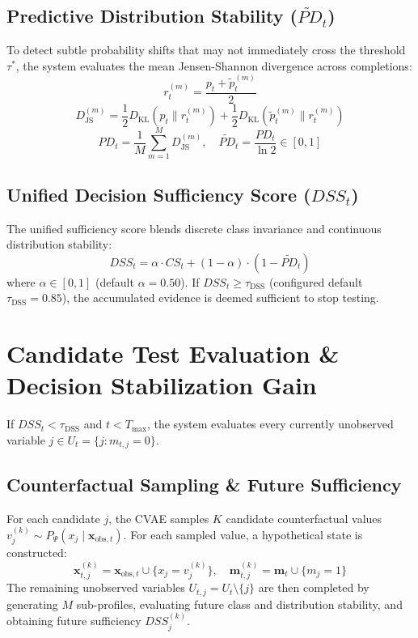 \documentclass[11pt,a4paper]{report}
\begin{document}
\subsection{Predictive Distribution Stability ($\widetilde{PD}_t$)}
To detect subtle probability shifts that may not immediately cross the threshold $\tau^*$, the system evaluates the mean Jensen-Shannon divergence across completions:
\begin{equation}
  r_t^{(m)} = \frac{p_t + \tilde{p}_t^{(m)}}{2}
\end{equation}
\begin{equation}
  D_{\text{JS}}^{(m)} = \frac{1}{2} D_{\text{KL}}(p_t \parallel r_t^{(m)}) + \frac{1}{2} D_{\text{KL}}(\tilde{p}_t^{(m)} \parallel r_t^{(m)})
\end{equation}
\begin{equation}
  PD_t = \frac{1}{M} \sum_{m=1}^M D_{\text{JS}}^{(m)}, \quad
  \widetilde{PD}_t = \frac{PD_t}{\ln 2} \in [0, 1]
\end{equation}

\subsection{Unified Decision Sufficiency Score ($DSS_t$)}
The unified sufficiency score blends discrete class invariance and continuous distribution stability:
\begin{equation}
  DSS_t = \alpha \cdot CS_t + (1 - \alpha) \cdot (1 - \widetilde{PD}_t)
\end{equation}
where $\alpha \in [0, 1]$ (default $\alpha = 0.50$). If $DSS_t \ge \tau_{\text{DSS}}$ (configured default $\tau_{\text{DSS}} = 0.85$), the accumulated evidence is deemed sufficient to stop testing.

\section{Candidate Test Evaluation \& Decision Stabilization Gain}
If $DSS_t < \tau_{\text{DSS}}$ and $t < T_{\max}$, the system evaluates every currently unobserved variable $j \in U_t = \{j : m_{t,j} = 0\}$.

\subsection{Counterfactual Sampling \& Future Sufficiency}
For each candidate $j$, the CVAE samples $K$ candidate counterfactual values $v_j^{(k)} \sim P_\Psi(x_j \mid \mathbf{x}_{\text{obs},t})$. For each sampled value, a hypothetical state is constructed:
\begin{equation}
  \mathbf{x}_{t,j}^{(k)} = \mathbf{x}_{\text{obs},t} \cup \{x_j = v_j^{(k)}\}, \quad \mathbf{m}_{t,j}^{(k)} = \mathbf{m}_t \cup \{m_j = 1\}
\end{equation}
The remaining unobserved variables $U_{t,j} = U_t \setminus \{j\}$ are then completed by generating $M$ sub-profiles, evaluating future class and distribution stability, and obtaining future sufficiency $DSS_j^{(k)}$.
\end{document}
